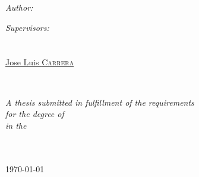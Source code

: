 \documentclass[
11pt, %
english, %
singlespacing, %
headsepline, %
]{MastersDoctoralThesis} %
\newcommand{\supername}{Jose Luis \textsc{Carrera}}
\begin{document}
\begin{titlepage}
\begin{center}
\begin{minipage}[t]{0.4\textwidth}
\begin{flushleft} \large
\emph{Author:}\\
\href{http://www.joelniklaus.ch}{\authorname} %
\end{flushleft}
\end{minipage}
\begin{minipage}[t]{0.4\textwidth}
\begin{flushright} \large
\emph{Supervisors:} \\
\href{http://www.inf.unibe.ch/ueber_uns/personen/prof_dr_braun_torsten/index_ger.html}{\examname} \\ %
\href{http://www.inf.unibe.ch/ueber_uns/personen/dr_zhao_zhongliang/index_ger.html}{\supname} \\ %
\href{http://www.inf.unibe.ch/ueber_uns/personen/carrera_jos_luis/index_ger.html}{\supername} %
\end{flushright}
\end{minipage}\\[3cm]
 
\vfill

\large \textit{A thesis submitted in fulfillment of the requirements\\ for the degree of \degreename}\\[0.3cm] %
\textit{in the}\\[0.4cm]
\groupname\\\deptname\\[2cm] %
 
\vfill

{\large \today}\\[4cm] %
 
\vfill
\end{center}
\end{titlepage}

\end{document}
